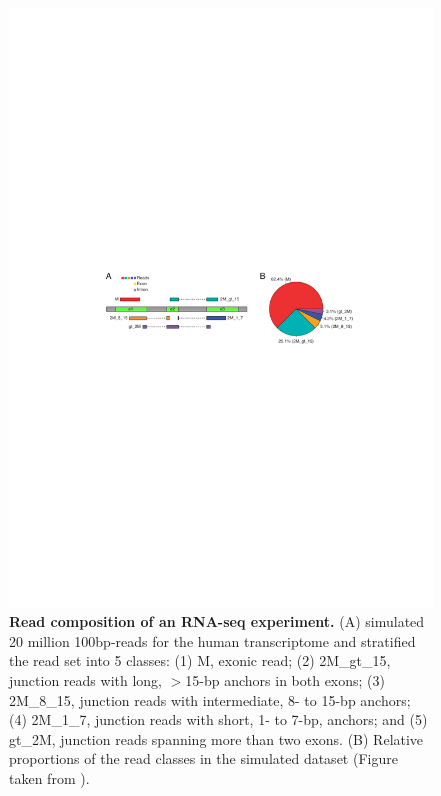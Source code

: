 \begin{figure}[h]
	 \centering
	 \includegraphics[width=1\linewidth]{img/chapter1/spliced_read_classes}
	  \caption[Read composition of an RNA-seq experiment]{\textbf{Read composition of an RNA-seq experiment.} (A) \citeauthor{Kim2015} simulated 20 million 100bp-reads for the human transcriptome and stratified the read set into 5 classes: (1) M, exonic read; (2) 2M\_gt\_15, junction reads with long, $>$15-bp anchors in both exons;
(3) 2M\_8\_15, junction reads with intermediate, 8- to 15-bp anchors; (4) 2M\_1\_7, junction reads with short, 1- to 7-bp, anchors; and (5) gt\_2M, junction reads spanning more than two exons. (B) Relative proportions of the read classes in the simulated dataset (Figure taken from \citeauthor{Kim2015} \citep{Kim2015}).}
	 \label{fig:splice_read_classes}
\end{figure}


